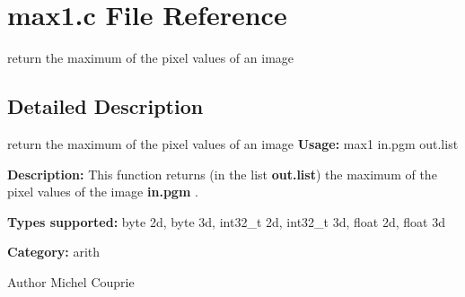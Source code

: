 \section{max1.c File Reference}
\label{max1_8c}


return the maximum of the pixel values of an image  




\subsection{Detailed Description}
return the maximum of the pixel values of an image {\bfseries Usage:} max1 in.pgm out.list

{\bfseries Description:} This function returns (in the list {\bfseries out.list}) the maximum of the pixel values of the image {\bfseries in.pgm} .

{\bfseries Types supported:} byte 2d, byte 3d, int32\_\-t 2d, int32\_\-t 3d, float 2d, float 3d

{\bfseries Category:} arith

\begin{DoxyAuthor}{Author}
Michel Couprie 
\end{DoxyAuthor}
